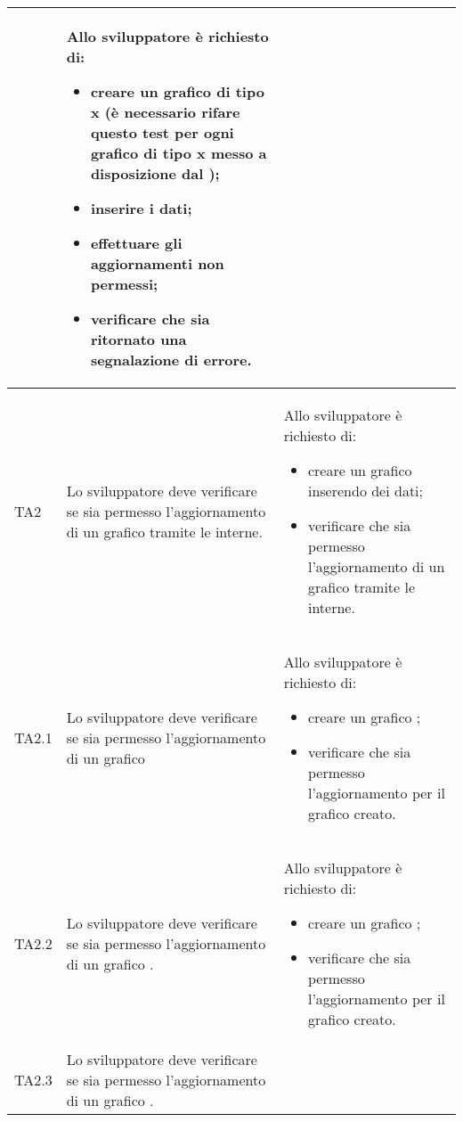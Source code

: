 \begin{longtabu}{| X[0.5] | X | X |}
		& Allo sviluppatore è richiesto di:
		\begin{itemize}
			\item creare un grafico di tipo x (è necessario rifare questo test per ogni grafico di tipo x messo a disposizione dal );
			\item inserire i dati;
			\item effettuare gli aggiornamenti non permessi;
			\item verificare che sia ritornato una segnalazione di errore.
		\end{itemize}
\\ \hline

	TA2 & Lo sviluppatore deve verificare se sia permesso l'aggiornamento di un grafico tramite le  interne.
		
		& Allo sviluppatore è richiesto di:
		\begin{itemize}
			\item creare un grafico inserendo dei dati;
			\item verificare che sia permesso l'aggiornamento di un grafico tramite le  interne.
		\end{itemize}
\\ \hline

	TA2.1 & Lo sviluppatore deve verificare se sia permesso l'aggiornamento  di un grafico 
		
		& Allo sviluppatore è richiesto di:
		\begin{itemize}
			\item creare un grafico ;
			\item verificare che sia permesso l'aggiornamento  per il grafico creato.
		\end{itemize}
\\ \hline

	TA2.2 & Lo sviluppatore deve verificare se sia permesso l'aggiornamento di un grafico .
		
		& Allo sviluppatore è richiesto di:
		\begin{itemize}
			\item creare un grafico ;
			\item verificare che sia permesso l'aggiornamento  per il grafico creato.
		\end{itemize}
\\ \hline

	TA2.3 & Lo sviluppatore deve verificare se sia permesso l'aggiornamento  di un grafico .
		

\end{longtabu}
